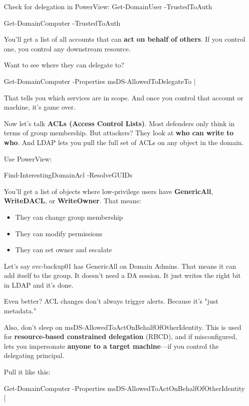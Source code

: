 Check for delegation in PowerView:
Get-DomainUser -TrustedToAuth

Get-DomainComputer -TrustedToAuth

You’ll get a list of all accounts that can \textbf{act on behalf of others}. If you control one, you control any downstream resource.

Want to see where they can delegate to?

Get-DomainComputer -Properties msDS-AllowedToDelegateTo |

That tells you which services are in scope. And once you control that account or machine, it’s game over.

Now let’s talk \textbf{ACLs (Access Control Lists)}. Most defenders only think in terms of group membership. But attackers? They look at \textbf{who can write to who}. And LDAP lets you pull the full set of ACLs on any object in the domain.

Use PowerView:

Find-InterestingDomainAcl -ResolveGUIDs

You’ll get a list of objects where low-privilege users have \textbf{GenericAll}, \textbf{WriteDACL}, or \textbf{WriteOwner}. That means:

\begin{itemize}
    \item They can change group membership

    \item They can modify permissions

    \item They can set owner and escalate

\end{itemize}
Let’s say svc-backup01 has GenericAll on Domain Admins. That means it can add itself to the group. It doesn’t need a DA session. It just writes the right bit in LDAP and it’s done.

Even better? ACL changes don’t always trigger alerts. Because it’s "just metadata."

Also, don’t sleep on msDS-AllowedToActOnBehalfOfOtherIdentity. This is used for \textbf{resource-based constrained delegation} (RBCD), and if misconfigured, lets you impersonate \textbf{anyone to a target machine}—if you control the delegating principal.

Pull it like this:

Get-DomainComputer -Properties msDS-AllowedToActOnBehalfOfOtherIdentity |

